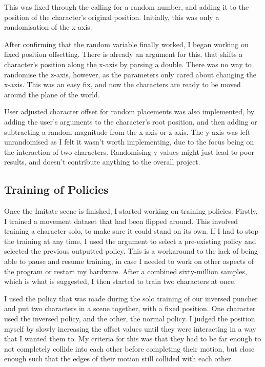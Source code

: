 \documentclass{l4proj}
\begin{document}
This was fixed through the calling for a random number, and adding it to the position of the character's original position. Initially, this was only a randomisation of the x-axis.

After confirming that the random variable finally worked, I began working on fixed position offsetting. There is already an argument for this, that shifts a character's position along the x-axis by parsing a double. There was no way to randomise the z-axis, however, as the parameters only cared about changing the x-axis. This was an easy fix, and now the characters are ready to be moved around the plane of the world.

User adjusted character offset for random placements was also implemented, by adding the user's arguments to the character's root position, and then adding or subtracting a random magnitude from the x-axis or z-axis. The y-axis was left unrandomised as I felt it wasn't worth implementing, due to the focus being on the interaction of two characters. Randomising y values might just lead to poor results, and doesn't contribute anything to the overall project.

\subsection{Training of Policies}
Once the Imitate scene is finished, I started working on training policies. Firstly, I trained a movement dataset that had been flipped around. This involved training a character solo, to make sure it could stand on its own. If I had to stop the training at any time, I used the argument to select a pre-existing policy and selected the previous outputted policy. This is a workaround to the lack of being able to pause and resume training, in case I needed to work on other aspects of the program or restart my hardware. After a combined sixty-million samples, which is what is suggested, I then started to train two characters at once.

I used the policy that was made during the solo training of our inversed puncher and put two characters in a scene together, with a fixed position. One character used the inversed policy, and the other, the normal policy. I judged the position myself by slowly increasing the offset values until they were interacting in a way that I wanted them to. My criteria for this was that they had to be far enough to not completely collide into each other before completing their motion, but close enough such that the edges of their motion still collided with each other.
\end{document}

